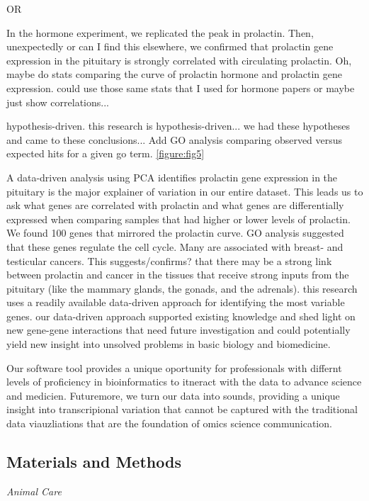 OR 


In the hormone experiment, we replicated the peak in prolactin. Then, unexpectedly or can I find this elsewhere, we confirmed that prolactin gene expression in the pituitary is strongly correlated with circulating prolactin. Oh, maybe do stats comparing the curve of prolactin hormone and prolactin gene expression. could use those same stats that I used for hormone papers or maybe just show correlations... 

hypothesis-driven. this research is hypothesis-driven... we had these hypotheses and came to these conclusions... Add GO analysis comparing observed versus expected hits for a given go term. \ref{figure:fig5}

A data-driven analysis using PCA identifies prolactin gene expression in the pituitary is the major explainer of variation in our entire dataset. This leads us to ask what genes are correlated with prolactin and what genes are differentially expressed when comparing samples that had higher or lower levels of prolactin. We found 100 genes that mirrored the prolactin curve. GO analysis suggested that these genes regulate the cell cycle. Many are associated with breast- and testicular cancers. This suggests/confirms? that there may be a strong link between prolactin and cancer in the tissues that receive strong inputs from the pituitary (like the mammary glands, the gonads, and the adrenals). this research uses a readily available data-driven approach for identifying the most variable genes. our data-driven approach supported existing knowledge and shed light on new gene-gene interactions that need future investigation and could potentially yield new insight into unsolved problems in basic biology and biomedicine. 

Our software tool provides a unique oportunity for professionals with differnt levels of proficiency in bioinformatics to itneract with the data to advance science and medicien. Futuremore, we turn our data into sounds, providing a unique insight into transcripional variation that cannot be captured with the traditional data viauzliations that are the foundation of omics science communication. 

\hypertarget{materials-and-methods}{%
\subsection{Materials and Methods}\label{materials-and-methods}}

\emph{Animal Care}


